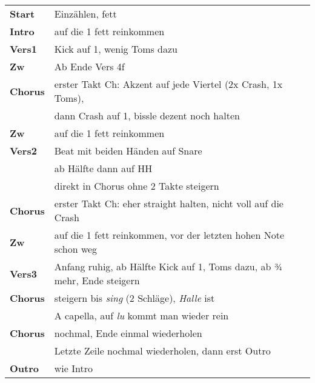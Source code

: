 \begin{tabular}{p{1.6cm}l}
	\textbf{Start}  & Einzählen, fett                                                         \\
	\textbf{Intro}  & auf die 1 fett reinkommen                                               \\
	\textbf{Vers1}  & Kick auf 1, wenig Toms dazu                                             \\
	\textbf{Zw}     & Ab Ende Vers 4f                                                         \\
	\textbf{Chorus} & erster Takt Ch: Akzent auf jede Viertel (2x Crash, 1x Toms),            \\
	                & dann Crash auf 1, bissle dezent noch halten                             \\
	\textbf{Zw}     & auf die 1 fett reinkommen                                               \\
	\textbf{Vers2}  & Beat mit beiden Händen auf Snare                                        \\
	                & ab Hälfte dann auf HH                                                   \\
	                & direkt in Chorus ohne 2 Takte steigern                                  \\
	\textbf{Chorus} & erster Takt Ch: eher straight halten, nicht voll auf die Crash          \\
	\textbf{Zw}     & auf die 1 fett reinkommen, vor der letzten hohen Note schon weg         \\
	\textbf{Vers3}  & Anfang ruhig, ab Hälfte Kick auf 1, Toms dazu, ab ¾ mehr, Ende steigern \\
	\textbf{Chorus} & steigern bis \textit{sing} (2 Schläge), \textit{Halle} ist              \\
	                & A capella, auf \textit{lu} kommt man wieder rein                        \\
	\textbf{Chorus} & nochmal, Ende einmal wiederholen                                        \\
	                & Letzte Zeile nochmal wiederholen, dann erst Outro                       \\
	\textbf{Outro}  & wie Intro                                                               \\
\end{tabular}
